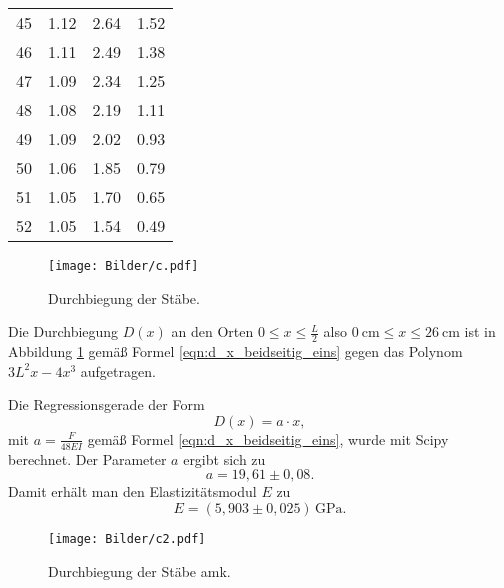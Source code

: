 \begin{longtable}[c]{cccc}
	45                        & 1.12                           & 2.64                                      & 1.52                         \\
	46                        & 1.11                           & 2.49                                      & 1.38                         \\
	47                        & 1.09                           & 2.34                                      & 1.25                         \\
	48                        & 1.08                           & 2.19                                      & 1.11                         \\
	49                        & 1.09                           & 2.02                                      & 0.93                         \\
	50                        & 1.06                           & 1.85                                      & 0.79                         \\
	51                        & 1.05                           & 1.70                                      & 0.65                         \\
	52                        & 1.05                           & 1.54                                      & 0.49                         \\
\end{longtable}

\begin{figure}
	\centering
	\texttt{[image: Bilder/c.pdf]}
	\caption{Durchbiegung der Stäbe.}
	\label{fig:Stabus}
\end{figure}

Die Durchbiegung $D(x)$ an den Orten $0 \leq x \leq \frac{L}{2}$
also $\SI{0}{\centi\meter} \leq x \leq \SI{26}{\centi\meter}$
ist in Abbildung \ref{fig:Stabus} gemäß Formel \eqref{eqn:d_x_beidseitig_eins} gegen das
Polynom $3L^2x - 4x^3$ aufgetragen.

Die Regressionsgerade der Form
\begin{equation*}
	D(x) = a \cdot x \mathrm{,}
\end{equation*}
mit $a = \frac{F}{48EI}$ gemäß Formel \eqref{eqn:d_x_beidseitig_eins}, wurde mit Scipy
\cite{scipy} berechnet.
Der Parameter $a$ ergibt sich zu
\begin{equation*}
	a = 19,61 \pm 0,08 \mathrm{.}
\end{equation*}
Damit erhält man den Elastizitätsmodul $E$ zu
\begin{equation*}
	E = (5,903 \pm 0,025) \, \si{\giga\pascal} \mathrm{.}
\end{equation*}
\begin{figure}
	\centering
	\texttt{[image: Bilder/c2.pdf]}
	\caption{Durchbiegung der Stäbe amk.}
	\label{fig:StabusMaximus}
\end{figure}

